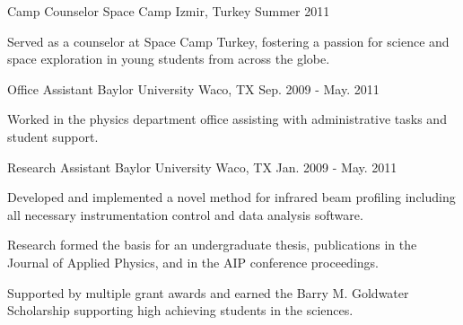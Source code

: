 \begin{cventries}
    \vspace{2em}

    \cventry
        {Camp Counselor} %
        {Space Camp} %
        {Izmir, Turkey} %
        {Summer 2011} %
        {
        \begin{cvitems} %
            \item {Served as a counselor at Space Camp Turkey, fostering a passion for science and space exploration in young students from across the globe.}
        \end{cvitems}
        }

    \vspace{2em}

    \cventry
        {Office Assistant} %
        {Baylor University} %
        {Waco, TX} %
        {Sep. 2009 - May. 2011} %
        {
        \begin{cvitems} %
            \item {Worked in the physics department office assisting with administrative tasks and student support.}
        \end{cvitems}
        }

    \vspace{2em}

    \cventry
        {Research Assistant} %
        {Baylor University} %
        {Waco, TX} %
        {Jan. 2009 - May. 2011} %
        {
        \begin{cvitems} %
            \item {Developed and implemented a novel method for infrared beam profiling including all necessary instrumentation control and data analysis software.}
            \item {Research formed the basis for an undergraduate thesis, publications in the Journal of Applied Physics, and in the AIP conference proceedings.}
            \item {Supported by multiple grant awards and earned the Barry M. Goldwater Scholarship supporting high achieving students in the sciences.}
        \end{cvitems}
        }

    \vspace{2em}


\end{cventries}
